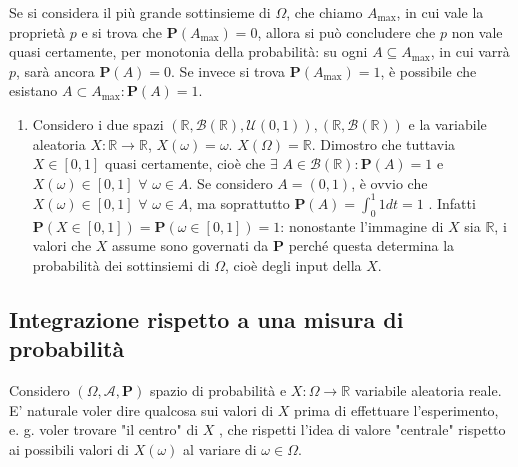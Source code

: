 \documentclass{article}
\begin{document}
Se si considera il pi\`{u} grande sottinsieme di $\Omega $, che chiamo $%
A_{\max }$, in cui vale la propriet\`{a} $p$ e si trova che $\mathbf{P}%
\left( A_{\max }\right) =0$, allora si pu\`{o} concludere che $p$ non vale
quasi certamente, per monotonia della probabilit\`{a}: su ogni $A\subseteq
A_{\max }$, in cui varr\`{a} $p$, sar\`{a} ancora $\mathbf{P}\left( A\right)
=0$. Se invece si trova $\mathbf{P}\left( A_{\max }\right) =1$, \`{e}
possibile che esistano $A\subset A_{\max }:\mathbf{P}\left( A\right) =1$.

\begin{enumerate}
\item Considero i due spazi $\left( 
\mathbb{R}
,\mathcal{B}\left( 
\mathbb{R}
\right) ,\mathcal{U}\left( 0,1\right) \right) ,\left( 
\mathbb{R}
,\mathcal{B}\left( 
\mathbb{R}
\right) \right) $ e la variabile aleatoria $X:%
\mathbb{R}
\rightarrow 
\mathbb{R}
$, $X\left( \omega \right) =\omega $. $X\left( \Omega \right) =%
\mathbb{R}
$. Dimostro che tuttavia $X\in \left[ 0,1\right] $ quasi certamente, cio\`{e}
che $\exists $ $A\in \mathcal{B}\left( 
\mathbb{R}
\right) :\mathbf{P}\left( A\right) =1$ e $X\left( \omega \right) \in \left[
0,1\right] $ $\forall $ $\omega \in A$. Se considero $A=\left( 0,1\right) $, 
\`{e} ovvio che $X\left( \omega \right) \in \left[ 0,1\right] $ $\forall $ $%
\omega \in A$, ma soprattutto $\mathbf{P}\left( A\right) =\int_{0}^{1}1dt=1$%
. Infatti $\mathbf{P}\left( X\in \left[ 0,1\right] \right) =\mathbf{P}\left(
\omega \in \left[ 0,1\right] \right) =1$: nonostante l'immagine di $X$ sia $%
\mathbb{R}
$, i valori che $X$ assume sono governati da $\mathbf{P}$ perch\'{e} questa
determina la probabilit\`{a} dei sottinsiemi di $\Omega $, cio\`{e} degli
input della $X$.
\end{enumerate}

\subsection{Integrazione rispetto a una misura di probabilit\`{a}}

Considero $\left( \Omega ,\mathcal{A},\mathbf{P}\right) $ spazio di
probabilit\`{a} e $X:\Omega \rightarrow 
\mathbb{R}
$ variabile aleatoria reale. E' naturale voler dire qualcosa sui valori di $%
X $ prima di effettuare l'esperimento, e. g. voler trovare "il centro" di $X$%
, che rispetti l'idea di valore "centrale" rispetto ai possibili valori di $%
X\left( \omega \right) $ al variare di $\omega \in \Omega $.
\end{document}
